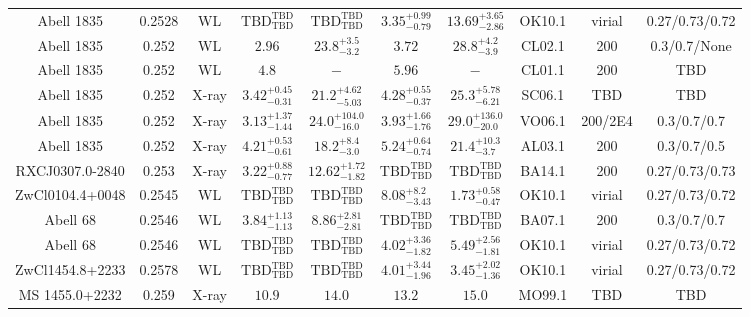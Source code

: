 \begin{table}
\begin{tabular}{cccccccccc}
Abell 1835 & 0.2528 & WL & ${\mathrm{TBD}}^{\mathrm{TBD}}_{\mathrm{TBD}}$ & ${\mathrm{TBD}}^{\mathrm{TBD}}_{\mathrm{TBD}}$ & ${3.35}^{+0.99}_{-0.79}$ & ${13.69}^{+3.65}_{-2.86}$ & OK10.1 & virial & 0.27/0.73/0.72 \\
Abell 1835 & 0.252 & WL & ${2.96}^{}_{}$ & ${23.8}^{+3.5}_{-3.2}$ & ${3.72}^{}_{}$ & ${28.8}^{+4.2}_{-3.9}$ & CL02.1 & 200 & 0.3/0.7/None \\
Abell 1835 & 0.252 & WL & ${4.8}^{}_{}$ & ${-}^{}_{}$ & ${5.96}^{}_{}$ & ${-}^{}_{}$ & CL01.1 & 200 & TBD \\
Abell 1835 & 0.252 & X-ray & ${3.42}^{+0.45}_{-0.31}$ & ${21.2}^{+4.62}_{-5.03}$ & ${4.28}^{+0.55}_{-0.37}$ & ${25.3}^{+5.78}_{-6.21}$ & SC06.1 & TBD & TBD \\
Abell 1835 & 0.252 & X-ray & ${3.13}^{+1.37}_{-1.44}$ & ${24.0}^{+104.0}_{-16.0}$ & ${3.93}^{+1.66}_{-1.76}$ & ${29.0}^{+136.0}_{-20.0}$ & VO06.1 & 200/2E4 & 0.3/0.7/0.7 \\
Abell 1835 & 0.252 & X-ray & ${4.21}^{+0.53}_{-0.61}$ & ${18.2}^{+8.4}_{-3.0}$ & ${5.24}^{+0.64}_{-0.74}$ & ${21.4}^{+10.3}_{-3.7}$ & AL03.1 & 200 & 0.3/0.7/0.5 \\
RXCJ0307.0-2840 & 0.253 & X-ray & ${3.22}^{+0.88}_{-0.77}$ & ${12.62}^{+1.72}_{-1.82}$ & ${\mathrm{TBD}}^{\mathrm{TBD}}_{\mathrm{TBD}}$ & ${\mathrm{TBD}}^{\mathrm{TBD}}_{\mathrm{TBD}}$ & BA14.1 & 200 & 0.27/0.73/0.73 \\
ZwCl0104.4+0048 & 0.2545 & WL & ${\mathrm{TBD}}^{\mathrm{TBD}}_{\mathrm{TBD}}$ & ${\mathrm{TBD}}^{\mathrm{TBD}}_{\mathrm{TBD}}$ & ${8.08}^{+8.2}_{-3.43}$ & ${1.73}^{+0.58}_{-0.47}$ & OK10.1 & virial & 0.27/0.73/0.72 \\
Abell 68 & 0.2546 & WL & ${3.84}^{+1.13}_{-1.13}$ & ${8.86}^{+2.81}_{-2.81}$ & ${\mathrm{TBD}}^{\mathrm{TBD}}_{\mathrm{TBD}}$ & ${\mathrm{TBD}}^{\mathrm{TBD}}_{\mathrm{TBD}}$ & BA07.1 & 200 & 0.3/0.7/0.7 \\
Abell 68 & 0.2546 & WL & ${\mathrm{TBD}}^{\mathrm{TBD}}_{\mathrm{TBD}}$ & ${\mathrm{TBD}}^{\mathrm{TBD}}_{\mathrm{TBD}}$ & ${4.02}^{+3.36}_{-1.82}$ & ${5.49}^{+2.56}_{-1.81}$ & OK10.1 & virial & 0.27/0.73/0.72 \\
ZwCl1454.8+2233 & 0.2578 & WL & ${\mathrm{TBD}}^{\mathrm{TBD}}_{\mathrm{TBD}}$ & ${\mathrm{TBD}}^{\mathrm{TBD}}_{\mathrm{TBD}}$ & ${4.01}^{+3.44}_{-1.96}$ & ${3.45}^{+2.02}_{-1.36}$ & OK10.1 & virial & 0.27/0.73/0.72 \\
MS 1455.0+2232 & 0.259 & X-ray & ${10.9}^{}_{}$ & ${14.0}^{}_{}$ & ${13.2}^{}_{}$ & ${15.0}^{}_{}$ & MO99.1 & TBD & TBD \\

\end{tabular}
\end{table}
